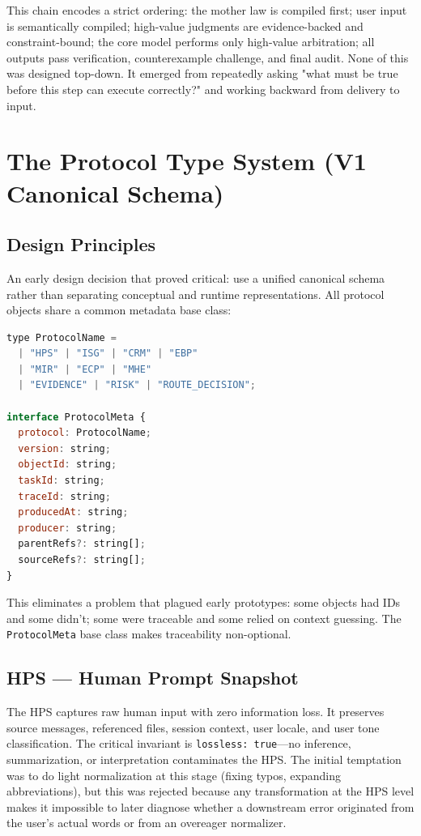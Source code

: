 \documentclass[12pt,a4paper]{article}
\begin{document}
This chain encodes a strict ordering: the mother law is compiled first; user input is semantically compiled; high-value judgments are evidence-backed and constraint-bound; the core model performs only high-value arbitration; all outputs pass verification, counterexample challenge, and final audit. None of this was designed top-down. It emerged from repeatedly asking "what must be true before this step can execute correctly?" and working backward from delivery to input.

\section{The Protocol Type System (V1 Canonical Schema)}


\subsection{Design Principles}


An early design decision that proved critical: use a unified canonical schema rather than separating conceptual and runtime representations. All protocol objects share a common metadata base class:

\begin{lstlisting}[language=JavaScript]
type ProtocolName =
  | "HPS" | "ISG" | "CRM" | "EBP"
  | "MIR" | "ECP" | "MHE"
  | "EVIDENCE" | "RISK" | "ROUTE_DECISION";

interface ProtocolMeta {
  protocol: ProtocolName;
  version: string;
  objectId: string;
  taskId: string;
  traceId: string;
  producedAt: string;
  producer: string;
  parentRefs?: string[];
  sourceRefs?: string[];
}
\end{lstlisting}


This eliminates a problem that plagued early prototypes: some objects had IDs and some didn't; some were traceable and some relied on context guessing. The \texttt{ProtocolMeta} base class makes traceability non-optional.

\subsection{HPS --- Human Prompt Snapshot}


The HPS captures raw human input with zero information loss. It preserves source messages, referenced files, session context, user locale, and user tone classification. The critical invariant is \texttt{lossless: true}---no inference, summarization, or interpretation contaminates the HPS. The initial temptation was to do light normalization at this stage (fixing typos, expanding abbreviations), but this was rejected because any transformation at the HPS level makes it impossible to later diagnose whether a downstream error originated from the user's actual words or from an overeager normalizer.
\end{document}
